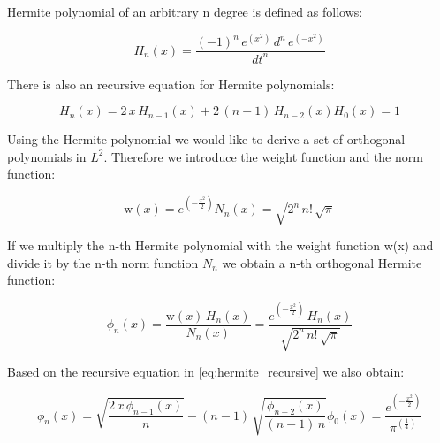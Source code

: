 \documentclass[12pt,twoside,a4paper]{article}
\numberwithin{equation}{subsection}
\numberwithin{figure}{subsection}
\begin{document}
Hermite polynomial of an arbitrary n degree is defined as follows:

\begin{equation} \label{eq:hermite_definition}
	H_n(x) = \frac {( - 1)^{n} \, e ^ {(x ^ 2)} \, d ^ n \, e^{( - x ^ 2)} } {{dt}^{n}}
\end{equation}

There is also an recursive equation for Hermite polynomials:

\begin{subequations} \label{eq:hermite_recursive}
  \begin{equation}   \label{eq:hrec_next}
    H_n (x) = 2 \, x \, H_{n - 1}(x) + 2 \, (n - 1) \, H_{n - 2}(x)
  \end{equation}
  \begin{equation}   \label{eq:hrec_first}
    H_0 (x) = 1
  \end{equation}
\end{subequations}

Using the Hermite polynomial we would like to derive a set of orthogonal polynomials in $L ^ 2$. Therefore we introduce the
weight function and the norm function:

\begin{subequations} \label{eq:hermite_weight}
  \begin{equation}   \label{eq:hwht_weight}
    \mathrm{w}(x) = e^{( - \frac {x^{2}}{2})}
  \end{equation}
  \begin{equation}   \label{eq:hwht_iter}
    N_n (x) = \sqrt{2^{n} \, n\mathrm{!} \, \sqrt{\pi }}
  \end{equation}
\end{subequations}

If we multiply the n-th Hermite polynomial with the weight function w(x) and divide it by the n-th norm function $N_n$ we
obtain a n-th orthogonal Hermite function:

\begin{equation} \label{eq:hermite_orthogonal}
  \phi_n (x) = \frac {\mathrm{w}(x) \, H_n (x)} {N_n (x)} 
  	= \frac {e^{( - \frac {x ^ 2}{2})} \, H_n (x)} {\sqrt{2^{n} \, n\mathrm{!} \, \sqrt {\pi }}}
\end{equation}

Based on the recursive equation in \ref{eq:hermite_recursive} we also obtain:

\begin{subequations} \label{eq:hermite_recresult}
  \begin{equation}   \label{eq:hrr_weight}
    \phi_n (x) = \sqrt{\frac {2 \, x \, {\phi_{n - 1}}(x)}{n}} - (n - 1) \, \sqrt{\frac {{\phi_{n - 2}}(x)} {(n - 1) \, n}}
  \end{equation}
  \begin{equation}   \label{eq:hrr_iter}
    \phi_0 (x) = \frac {e^{( - \frac {x ^ 2} {2})}} {\pi ^{(\frac {1}{4})}}
  \end{equation}
\end{subequations}
\end{document}
